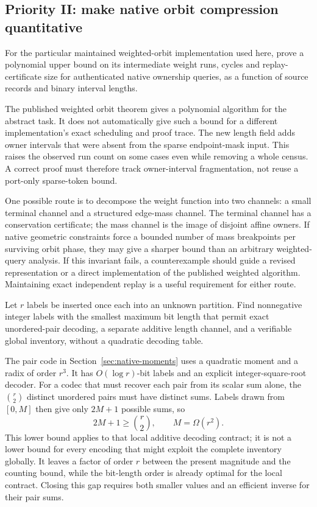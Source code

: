 \subsection{Priority II: make native orbit compression quantitative}

\begin{problem}
\label{prob:weight-runs}
For the particular maintained weighted-orbit implementation used here,
prove a polynomial upper bound on its intermediate weight runs, cycles
and replay-certificate size for authenticated native ownership queries,
as a function of source records and binary interval lengths.
\end{problem}

The published weighted orbit theorem gives a polynomial algorithm for
the abstract task.  It does not automatically give such a bound for a
different implementation's exact scheduling and proof trace.  The new
length field adds owner intervals that were absent from the sparse
endpoint-mask input.  This raises the observed run count on some cases
even while removing a whole census.  A correct proof must therefore
track owner-interval fragmentation, not reuse a port-only sparse-token
bound.

One possible route is to decompose the weight function into two channels:
a small terminal channel and a structured edge-mass channel.  The
terminal channel has a conservation certificate; the mass channel is
the image of disjoint affine owners.  If native geometric constraints
force a bounded number of mass breakpoints per surviving orbit phase,
they may give a sharper bound than an arbitrary weighted-query analysis.
If this invariant fails, a counterexample should guide a revised
representation or a direct implementation of the published weighted
algorithm.  Maintaining exact independent replay is a useful requirement
for either route.

\begin{problem}
Let $r$ labels be inserted once each into an unknown partition.  Find
nonnegative integer labels with the smallest maximum bit length that
permit exact unordered-pair decoding, a separate additive length channel,
and a verifiable global inventory, without a quadratic decoding table.
\end{problem}

The pair code in Section~\ref{sec:native-moments} uses a quadratic moment
and a radix of order $r^3$.  It has $O(\log r)$-bit labels and an explicit
integer-square-root decoder.  For a codec that must recover each pair
from its scalar sum alone, the $\binom r2$ distinct unordered pairs must
have distinct sums.  Labels drawn from $[0,M]$ then give only $2M+1$
possible sums, so
\[
  2M+1\geq\binom r2,\qquad M=\Omega(r^2).
\]
This lower bound applies to that local additive decoding contract; it is
not a lower bound for every encoding that might exploit the complete
inventory globally.  It leaves a factor of order $r$ between the present
magnitude and the counting bound, while the bit-length order is already
optimal for the local contract.  Closing this gap requires both smaller
values and an efficient inverse for their pair sums.

